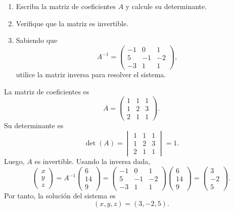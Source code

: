 \documentclass[11pt,a5]{aleph-examen}
\begin{document}
\begin{preguntas}
\begin{enumerate}
    \item Escriba la matriz de coeficientes $A$ y calcule su determinante.
    \item Verifique que la matriz es invertible.
    \item Sabiendo que
    \[
        A^{-1}= 
        \begin{pmatrix}
            -1 & 0 & 1 \\
            5 & -1 & -2 \\
            -3 & 1 & 1
        \end{pmatrix},
    \]
    utilice la matriz inversa para resolver el sistema.
\end{enumerate}

\begin{respuesta}
La matriz de coeficientes es
\[
    A=\begin{pmatrix}
        1 & 1 & 1 \\
        1 & 2 & 3 \\
        2 & 1 & 1
    \end{pmatrix}.
\]
Su determinante es
\[
    \det(A)=
    \begin{vmatrix}
        1 & 1 & 1 \\
        1 & 2 & 3 \\
        2 & 1 & 1
    \end{vmatrix}
    =1.
\]
Luego, \(A\) es invertible. Usando la inversa dada,
\[
    \begin{pmatrix}x\\y\\z\end{pmatrix}
    =A^{-1}\begin{pmatrix}6\\14\\9\end{pmatrix}
    =
    \begin{pmatrix}
        -1 & 0 & 1 \\
        5 & -1 & -2 \\
        -3 & 1 & 1
    \end{pmatrix}
    \begin{pmatrix}6\\14\\9\end{pmatrix}
    =
    \begin{pmatrix}3\\-2\\5\end{pmatrix}.
\]
Por tanto, la solución del sistema es
\[
    (x,y,z)=(3,-2,5).
\]
\end{respuesta}

\end{preguntas}
\end{document}
